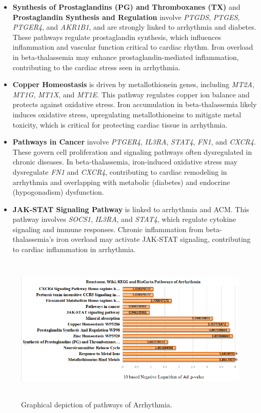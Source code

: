 \begin{itemize}
    \item \textbf{Synthesis of Prostaglandins (PG) and Thromboxanes (TX)} and \textbf{Prostaglandin Synthesis and Regulation} involve \textit{PTGDS}, \textit{PTGES}, \textit{PTGER4}, and \textit{AKR1B1}, and are strongly linked to arrhythmia and diabetes. These pathways regulate prostaglandin synthesis, which influences inflammation and vascular function critical to cardiac rhythm. Iron overload in beta-thalassemia may enhance prostaglandin-mediated inflammation, contributing to the cardiac stress seen in arrhythmia.

    \item \textbf{Copper Homeostasis} is driven by metallothionein genes, including \textit{MT2A}, \textit{MT1G}, \textit{MT1X}, and \textit{MT1E}. This pathway regulates copper ion balance and protects against oxidative stress. Iron accumulation in beta-thalassemia likely induces oxidative stress, upregulating metallothioneins to mitigate metal toxicity, which is critical for protecting cardiac tissue in arrhythmia.

    \item \textbf{Pathways in Cancer} involve \textit{PTGER4}, \textit{IL3RA}, \textit{STAT4}, \textit{FN1}, and \textit{CXCR4}. These govern cell proliferation and signaling pathways often dysregulated in chronic diseases. In beta-thalassemia, iron-induced oxidative stress may dysregulate \textit{FN1} and \textit{CXCR4}, contributing to cardiac remodeling in arrhythmia and overlapping with metabolic (diabetes) and endocrine (hypogonadism) dysfunction.

    \item \textbf{JAK-STAT Signaling Pathway} is linked to arrhythmia and ACM. This pathway involves \textit{SOCS1}, \textit{IL3RA}, and \textit{STAT4}, which regulate cytokine signaling and immune responses. Chronic inflammation from beta-thalassemia's iron overload may activate JAK-STAT signaling, contributing to cardiac inflammation in arrhythmia.
\end{itemize}

\begin{figure}[H]
\centering
\includegraphics[height=7cm]{./fig/fig4_9.png} 
\centering
\caption{ Graphical depiction of   pathways of Arrhythmia.}
\label{ Graphical depiction of   pathways of Arrhythmia.}
\end{figure}

